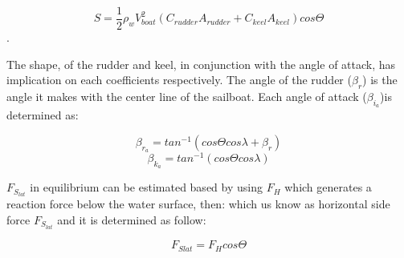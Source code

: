 \begin{equation}
    S=\frac{1}{2} \rho_{w} V_{boat}^2(C_{rudder}A_{rudder}+C_{keel}A_{keel})cos \Theta
\end{equation}.


The shape, of the rudder and keel, in conjunction with the angle of attack, has implication on each coefficients respectively. %
The angle of the rudder ($\beta_{r}$) is the angle it makes with the center line of the sailboat. Each angle of attack (\textit{$\beta_{i_{a}}$})is determined as: \par 
{}
\begin{equation}
    \beta_{r_{a}}=tan ^{-1} (cos \Theta cos \lambda + \beta_{r})
\end{equation}
\begin{equation}
    \beta_{k_{a}}=tan ^{-1} (cos \Theta cos \lambda )
\end{equation}

$F_{S_{lat}}$ in equilibrium can be estimated based by using $F_{H}$ which generates a reaction force below the water surface, then: %
which us know as horizontal side force $F_{S_{lat}}$ and it is determined as follow: \par
\begin{equation}
    F_{Slat}= F_{H}cos \Theta
\end{equation}

